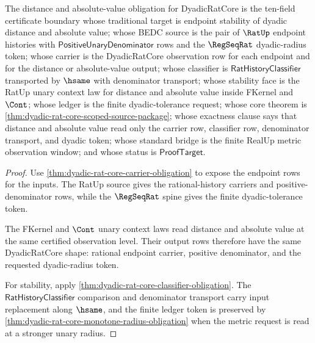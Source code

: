 \begin{theorem}
\label{thm:dyadic-rat-core-distance-absolute-obligation}
The distance and absolute-value obligation for DyadicRatCore is the ten-field
certificate boundary whose traditional target is endpoint stability of
dyadic distance and absolute value; whose BEDC source is the pair of $\RatUp$
endpoint histories with $\mathsf{PositiveUnaryDenominator}$ rows and the
$\RegSeqRat$ dyadic-radius token; whose carrier is the DyadicRatCore
observation row for each endpoint and for the distance or absolute-value
output; whose classifier is $\mathsf{RatHistoryClassifier}$ transported by
$\hsame$ with denominator transport; whose stability face is the RatUp unary
context law for distance and absolute value inside FKernel and $\Cont$; whose
ledger is the finite dyadic-tolerance request; whose core theorem is
\autoref{thm:dyadic-rat-core-scoped-source-package}; whose exactness clause
says that distance and absolute value read only the carrier row, classifier
row, denominator transport, and dyadic token; whose standard bridge is the
finite RealUp metric observation window; and whose status is
$\mathsf{ProofTarget}$.
\end{theorem}
\begin{proof}
Use \autoref{thm:dyadic-rat-core-carrier-obligation} to expose the endpoint
rows for the inputs. The RatUp source gives the rational-history carriers and
positive-denominator rows, while the $\RegSeqRat$ spine gives the finite
dyadic-tolerance token.

The FKernel and $\Cont$ unary context laws read distance and absolute value at
the same certified observation level. Their output rows therefore have the
same DyadicRatCore shape: rational endpoint carrier, positive denominator,
and the requested dyadic-radius token.

For stability, apply
\autoref{thm:dyadic-rat-core-classifier-obligation}. The
$\mathsf{RatHistoryClassifier}$ comparison and denominator transport carry
input replacement along $\hsame$, and the finite ledger token is preserved by
\autoref{thm:dyadic-rat-core-monotone-radius-obligation} when the metric
request is read at a stronger unary radius.
\end{proof}

